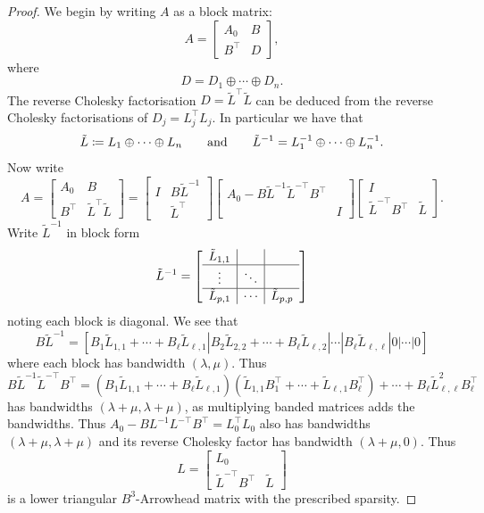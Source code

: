 \documentclass[hidelinks,onefignum,onetabnum]{siamart220329}
\def\qqand{\qquad\hbox{and}\qquad}
\begin{document}
\begin{proof}
We begin by writing $A$ as a block matrix:
\[
	A = \begin{bmatrix} 
		A_0 & B \\
		B^\top  & D
	\end{bmatrix},
\]
where
\[
	D = D_1 \oplus \cdots \oplus D_n.
\]
The reverse Cholesky factorisation $D = \tilde L^\top \tilde  L$ can be deduced from the reverse Cholesky factorisations of $D_j = L_j^\top L_j$. In particular we have that
\[
	\tilde  L \coloneqq L_1 \oplus \cdots \oplus L_n \qqand \tilde  L^{-1} = L_1^{-1} \oplus \cdots \oplus L_n^{-1}.
\]
Now write
\[
	A = \begin{bmatrix} 
		A_0 & B \\
		B^\top  & \tilde L^\top  \tilde  L
	\end{bmatrix} = \begin{bmatrix} I & B \tilde L^{-1}  \\ & \tilde  L^\top \end{bmatrix}  \begin{bmatrix} 
		A_0 - B \tilde  L^{-1} \tilde  L^{-\top} B^\top &  \\
		& I
	\end{bmatrix} \begin{bmatrix} I \\  \tilde L^{-\top} B^\top & \tilde L \end{bmatrix}.
\]
Write $\tilde L^{-1}$ in block form
\[
	\tilde L^{-1} = \left[\begin{array}{c | c | c}
		\tilde L_{1,1} && \\
		\hline
		\vdots & \ddots \\
		\hline 
		\tilde L_{p,1}& \cdots & \tilde L_{p,p}
	\end{array}\right]
\]
noting each block is diagonal. We see that
\[
	B \tilde L^{-1} = [B_1 \tilde L_{1,1} + \cdots + B_\ell \tilde L_{\ell,1} | B_2 \tilde L_{2,2} + \cdots + B_\ell \tilde L_{\ell,2} | \cdots | B_\ell \tilde L_{\ell,\ell} | 0 | \cdots | 0 ]
\]
where each block has bandwidth $(\lambda,\mu)$. Thus 
\[
	B \tilde  L^{-1} \tilde  L^{-\top} B^\top = (B_1 \tilde L_{1,1} + \cdots + B_\ell \tilde L_{\ell,1}) ( \tilde L_{1,1} B_1^\top + \cdots +  \tilde L_{\ell,1} B_\ell^\top)  + \cdots + B_\ell \tilde L_{\ell,\ell}^2 B_\ell^\top
\]
has bandwidths $(\lambda+\mu,\lambda+\mu)$, as multiplying banded matrices adds the bandwidths. Thus $A_0 - B L^{-1} L^{-\top} B^\top = L_0^\top L_0$ also has bandwidths $(\lambda+\mu,\lambda+\mu)$ and its reverse Cholesky factor has bandwidth $(\lambda+\mu,0)$. Thus 
\[
	L =  \begin{bmatrix} L_0 \\
		\tilde L^{-\top} B^\top & \tilde L
	\end{bmatrix}
\]
is a lower triangular $B^3$-Arrowhead matrix with the prescribed sparsity.

\end{proof}
\end{document}
